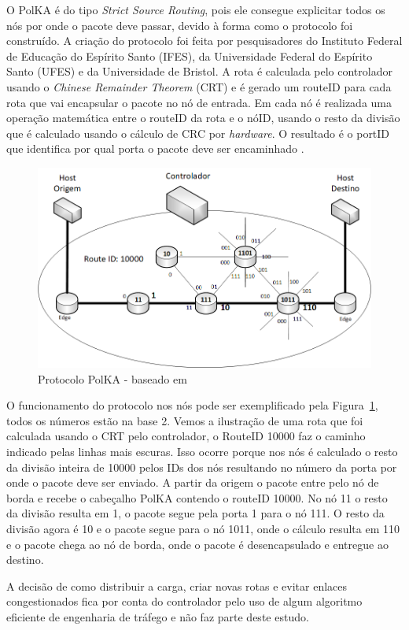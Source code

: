 \documentclass[12pt]{article}
\begin{document}
O PolKA é do tipo \textit{Strict Source Routing}, pois ele consegue explicitar todos os nós por onde o pacote deve passar, devido à forma como o protocolo foi construído. A criação do protocolo foi feita por pesquisadores do Instituto Federal de Educação do Espírito Santo (IFES), da Universidade Federal do Espírito Santo (UFES) e da Universidade de Bristol. A rota é calculada pelo controlador usando o \textit{Chinese Remainder Theorem} (CRT) e é gerado um routeID para cada rota que vai encapsular o pacote no nó de entrada. Em cada nó é realizada uma operação matemática entre o routeID da rota e o nóID, usando o resto da divisão que é calculado usando o cálculo de CRC por \textit{hardware}. O resultado é o portID que identifica por qual porta o pacote deve ser encaminhado \cite{dominicini2021deploying}.

\begin{figure}[ht]
\centering
\includegraphics[width=.5\textwidth]{PolKA.png}
\caption{Protocolo PolKA - baseado em \cite{dominicini2021deploying}}
\label{fig:polka}
\end{figure}

O funcionamento do protocolo nos nós pode ser exemplificado pela Figura~\ref{fig:polka}, todos os números estão na base 2. Vemos a ilustração de uma rota que foi calculada usando o CRT pelo controlador, o RouteID 10000 faz o caminho indicado pelas linhas mais escuras. Isso ocorre porque nos nós é calculado o resto da divisão inteira de 10000 pelos IDs dos nós resultando no número da porta por onde o pacote deve ser enviado. A partir da origem o pacote entre pelo nó de borda e recebe o cabeçalho PolKA contendo o routeID 10000. No nó 11 o resto da divisão resulta em 1, o pacote segue pela porta 1 para o nó 111. O resto da divisão agora é 10 e o pacote segue para o nó 1011, onde o cálculo resulta em 110 e o pacote chega ao nó de borda, onde o pacote é desencapsulado e entregue ao destino.

A decisão de como distribuir a carga, criar novas rotas e evitar enlaces congestionados fica por conta do controlador pelo uso de algum algoritmo eficiente de engenharia de tráfego e não faz parte deste estudo.
\end{document}
